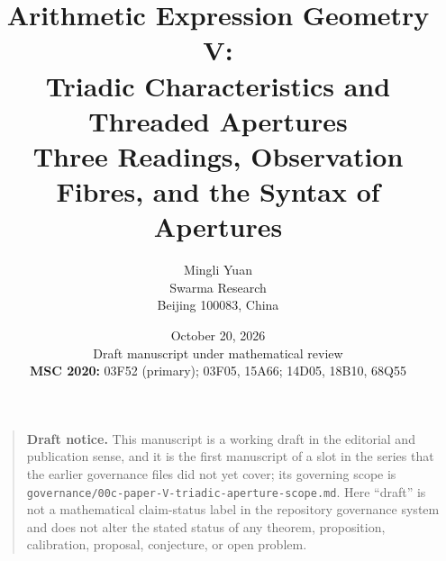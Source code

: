 \documentclass[11pt]{article}
\title{\textbf{Arithmetic Expression Geometry V:\\Triadic Characteristics and Threaded Apertures}\\[0.45em]
\large Three Readings, Observation Fibres, and the Syntax of Apertures}
\author{Mingli Yuan\\Swarma Research\\Beijing 100083, China}
\date{October 20, 2026\\[0.25em]
\small Draft manuscript under mathematical review\\[0.35em]
\small
\textbf{MSC 2020:} 03F52 (primary); 03F05, 15A66;
14D05, 18B10, 68Q55}
\theoremstyle{definition}
\theoremstyle{remark}
\begin{document}
\maketitle

\begin{quote}\small
\textbf{Draft notice.}
This manuscript is a working draft in the editorial and publication sense, and it is
the first manuscript of a slot in the series that the earlier governance files did
not yet cover; its governing scope is
\texttt{governance/00c-paper-V-triadic-aperture-scope.md}.  Here ``draft'' is not a
mathematical claim-status label in the repository governance system and does not
alter the stated status of any theorem, proposition, calibration, proposal,
conjecture, or open problem.
\end{quote}

%
\end{document}
